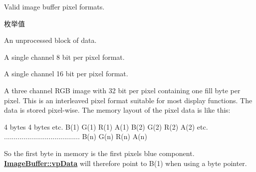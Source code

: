 Valid image buffer pixel formats. 

\begin{Desc}
\item[枚举值]\par
\begin{description}
\item[{\em 
\hypertarget{group___common_interface_gga456e8aa76e06bb761f27c52141475985a5d905f38e898045cb13a23ddd1526003}{ibpf\+Raw}\label{group___common_interface_gga456e8aa76e06bb761f27c52141475985a5d905f38e898045cb13a23ddd1526003}
}]An unprocessed block of data. \item[{\em 
\hypertarget{group___common_interface_gga456e8aa76e06bb761f27c52141475985a4d52eb7ae193d996ca974d948dae37e1}{ibpf\+Mono8}\label{group___common_interface_gga456e8aa76e06bb761f27c52141475985a4d52eb7ae193d996ca974d948dae37e1}
}]A single channel 8 bit per pixel format. \item[{\em 
\hypertarget{group___common_interface_gga456e8aa76e06bb761f27c52141475985aea243b25ef201ad2903df9d3309007b0}{ibpf\+Mono16}\label{group___common_interface_gga456e8aa76e06bb761f27c52141475985aea243b25ef201ad2903df9d3309007b0}
}]A single channel 16 bit per pixel format. \item[{\em 
\hypertarget{group___common_interface_gga456e8aa76e06bb761f27c52141475985aea8d0ccfc703d57645fedde0debf5093}{ibpf\+R\+G\+Bx888\+Packed}\label{group___common_interface_gga456e8aa76e06bb761f27c52141475985aea8d0ccfc703d57645fedde0debf5093}
}]A three channel R\+G\+B image with 32 bit per pixel containing one fill byte per pixel. This is an interleaved pixel format suitable for most display functions. The data is stored pixel-\/wise. The memory layout of the pixel data is like this\+:


\begin{DoxyCode}
4 bytes             4 bytes             etc.
B(1) G(1) R(1) A(1) B(2) G(2) R(2) A(2) etc.
.......................................
                    B(n) G(n) R(n) A(n)
\end{DoxyCode}


So the first byte in memory is the first pixels blue component. {\bfseries \hyperlink{struct_image_buffer_ab67c9c21d749e786302c848b508e0673}{Image\+Buffer\+::vp\+Data}} will therefore point to B(1) when using a byte pointer.


\end{description}
\end{Desc}
